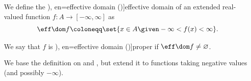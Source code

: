 \begin{definition}\label{def:effective_domain}\mimprovised
  We define the \term[ru=эффективное множество (\cite[50]{ПоловинкинБалашов2007ВыпуклыйАнализ}), en=effective domain (\cite[30]{Clarke2013OptimalControl})]{effective domain} of an extended real-valued function \( f: A \to [-\infty, \infty] \) as
  \begin{equation}\label{eq:def:effective_domain}
    \eff\dom f \coloneqq \set{ x \in A \given -\infty < f(x) < \infty }.
  \end{equation}

  We say that \( f \) is \term[ru=эффективное множество (\cite[50]{ПоловинкинБалашов2007ВыпуклыйАнализ}), en=effective domain (\cite[30]{Clarke2013OptimalControl})]{proper} if \( \eff\dom f \neq \varnothing \).
\end{definition}
\begin{comments}
  \item We base the definition on \cite[30]{Clarke2013OptimalControl} and \cite[50]{ПоловинкинБалашов2007ВыпуклыйАнализ}, but extend it to functions taking negative values (and possibly \( -\infty \)).
\end{comments}
